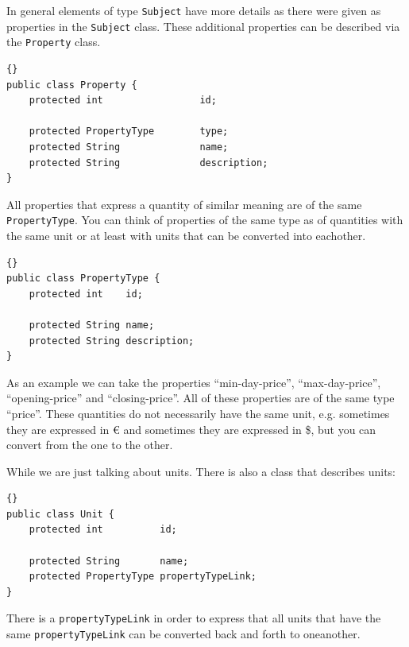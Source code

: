 \documentclass[a4paper,fleqn]{article}
\begin{document}
In general elements of type \lstinline!Subject! have more details as
there were given as properties in the \lstinline!Subject! class. These
additional properties can be described via the \lstinline!Property!
class.
\begin{lstlisting}[frame=trbl]{}
public class Property {
	protected int                 id;

	protected PropertyType        type;
	protected String              name;
	protected String              description;
}
\end{lstlisting}
All properties that express a quantity of similar meaning are of the
same \lstinline!PropertyType!. You can think of properties of the same
type as of quantities with the same unit or at least with units that
can be converted into eachother.
\begin{lstlisting}[frame=trbl]{}
public class PropertyType {
	protected int    id;

	protected String name;
	protected String description;
}
\end{lstlisting}
As an example we can take the properties ``min-day-price'',
``max-day-price'', ``opening-price'' and ``closing-price''. All of
these properties are of the same type ``price''. These quantities do not
necessarily have the same unit, e.g. sometimes they are expressed in
\euro{} and sometimes they are expressed in \$, but you can convert
from the one to the other.

While we are just talking about units. There is also a class that
describes units:
\begin{lstlisting}[frame=trbl]{}
public class Unit {
	protected int          id;

	protected String       name;
	protected PropertyType propertyTypeLink;
}
\end{lstlisting}
There is a \lstinline!propertyTypeLink! in order to express that all
units that have the same \lstinline!propertyTypeLink! can be converted
back and forth to oneanother.
\end{document}
